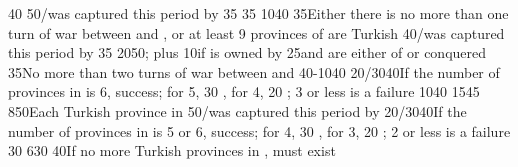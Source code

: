 %
%
%
{}{40}{}%
%
%
{}{50}{\provinceOsterreich/\villeVienne was captured this period by \TUR}%
%
%
{}{35}{}%
%
%
{}{35}{}%
%
%
{10}{40}{\EU@objSpiceTUR}%
%
%
%
{}{35}{Either there is no more than one turn of war between \AUSaus and \TUR,
  or at least 9 provinces of \payshongrie are Turkish}%
%
%
{}{40}{\provinceOsterreich/\villeVienne was captured this period by \TUR}%
%
%
{}{35}{}%
%
%
{20}{50}{; plus 10\VPs if \provinceCyclades is owned by
  \paysmajeurTurquie}%
%
\EUobjective{}{\paysvalachie/\paysmoldavie}{}%
{}{25}{\paysvalachie and \paysmoldavie are either \VASSAL of \TUR or
  conquered}%
%
%
%
{}{35}{No more than two turns of war between \AUSaus and \TUR}%
%
%
{40-10}{40}{\EU@objPresidiosTUR}%
%
%
{20/30}{40}{If the number of provinces in \payscrimee is 6, success; for 5, 30
  \VPs, for 4, 20 \VPs; 3 or less is a failure}%
%
%
{10}{40}{}%
%
%
{15}{45}{\EU@objMonopolyZone}%
%
%
%
{8}{50}{Each Turkish province in \payshongrie}%
%
%
{}{50}{\provinceOsterreich/\villeVienne was captured this period by \TUR}%
%
%
{20/30}{40}{If the number of provinces in \payscrimee is 5 or 6, success; for
  4, 30 \VPs, for 3, 20 \VPs; 2 or less is a failure}%
%
%
{}{30}{}%
%
%
{6}{30}{\EU@objSpiceTUR}%
%
%
%
%
{}{40}{If no more Turkish provinces in \payshongrie, \paystransylvanie must
  exist}%
%
%
%
